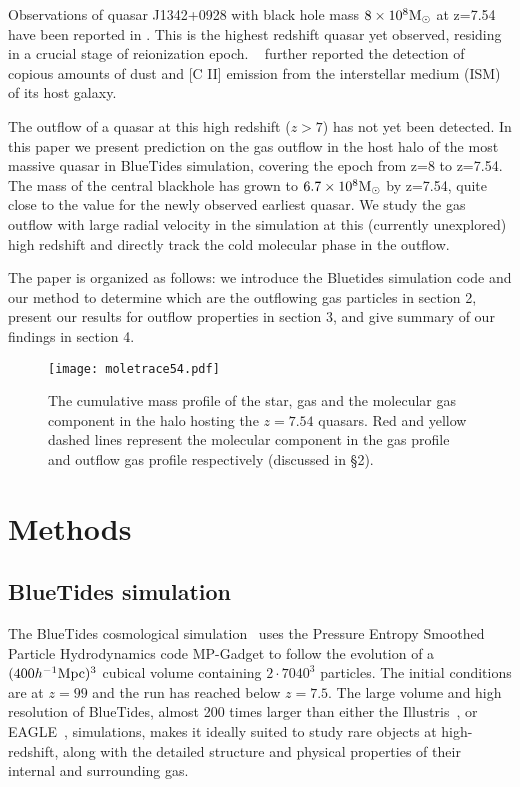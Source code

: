 \documentclass[a4paper,usenatbib]{mnras}
\begin{document}
Observations of quasar J1342+0928 with black hole mass $8\times 10^{8}\rm{M}_\odot$ at z=7.54 have been reported in \cite{Banados}. This is the highest redshift quasar yet observed, residing in a crucial stage of reionization epoch. ~\cite{Venemans2017} further reported the detection of copious amounts of dust and [C II] emission from the interstellar medium (ISM) of its host galaxy.

The outflow of a quasar at this high redshift ($z>7$) has not yet been detected. In this paper we present prediction on the gas outflow in the host halo of the most massive quasar in BlueTides simulation, covering the epoch from z=8 to z=7.54. The mass of the central blackhole has grown to $6.7\times 10^{8}\rm{M}_\odot$ by z=7.54, quite close to the value for the newly observed earliest quasar. We study the gas outflow with large radial velocity in the simulation at this (currently unexplored) high redshift and directly track the cold molecular phase in the outflow.

The paper is organized as follows: we introduce the Bluetides simulation code and our method to determine which are the outflowing gas particles in section 2, present our results for outflow properties in section 3, and give summary of our findings in section 4.

\begin{figure}
\texttt{[image: moletrace54.pdf]}
\caption{The cumulative mass profile of the star, gas and the molecular gas component in the halo hosting the $z=7.54$ quasars. Red and yellow dashed lines represent the molecular component in the gas profile and outflow gas profile respectively (discussed in \S2). }
\label{fig:figure01}
\end{figure}

\section{Methods}

\subsection{BlueTides simulation}

The BlueTides cosmological simulation~\citep{feng2016} uses the Pressure Entropy Smoothed Particle Hydrodynamics code MP-Gadget to follow the evolution of a $(400h^{-1}\rm{Mpc})^{3}$ cubical volume containing $2\cdot7040^{3}$ particles. The initial conditions are at $z=99$ and the run has reached below $z=7.5$. The large volume and high resolution of BlueTides, almost 200 times larger than either the Illustris~\citep{Vogelsberger}, or EAGLE~\citep{Schaye}, simulations, makes it ideally suited to study rare objects at high-redshift, along with the detailed structure and physical properties of their internal and surrounding gas.
\end{document}
